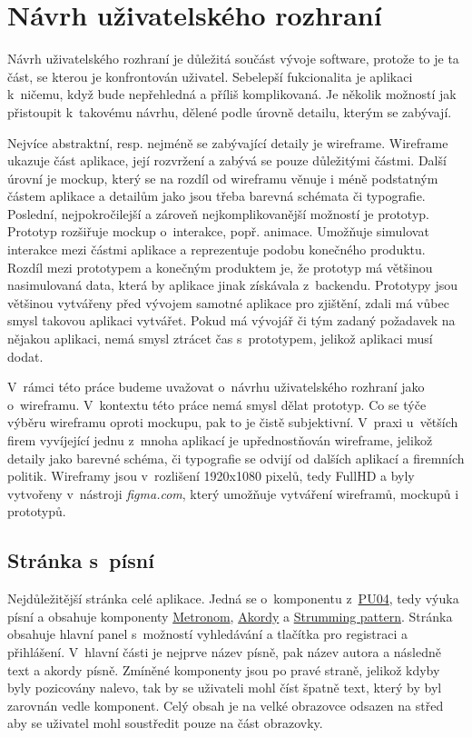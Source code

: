 \section{Návrh uživatelského rozhraní}
\label{sc:wireframes}
Návrh uživatelského rozhraní je důležitá součást vývoje software, protože to je ta část, se kterou je konfrontován uživatel. Sebelepší fukcionalita je aplikaci k~ničemu, když bude nepřehledná a příliš komplikovaná. Je několik možností jak přistoupit k~takovému návrhu, dělené podle úrovně detailu, kterým se zabývají.

Nejvíce abstraktní, resp. nejméně se zabývající detaily je wireframe. Wireframe ukazuje část aplikace, její rozvržení a zabývá se pouze důležitými částmi. Další úrovní je mockup, který se na rozdíl od wireframu věnuje i méně podstatným částem aplikace a detailům jako jsou třeba barevná schémata či typografie. Poslední, nejpokročilejší a zároveň nejkomplikovanější možností je prototyp. Prototyp rozšiřuje mockup o~interakce, popř. animace. Umožňuje simulovat interakce mezi částmi aplikace a reprezentuje podobu konečného produktu. Rozdíl mezi prototypem a konečným produktem je, že prototyp má většinou nasimulovaná data, která by aplikace jinak získávala z~backendu. Prototypy jsou většinou vytvářeny před vývojem samotné aplikace pro zjištění, zdali má vůbec smysl takovou aplikaci vytvářet. Pokud má vývojář či tým zadaný požadavek na nějakou aplikaci, nemá smysl ztrácet čas s~prototypem, jelikož aplikaci musí dodat.

V~rámci této práce budeme uvažovat o~návrhu uživatelského rozhraní jako o~wireframu. V~kontextu této práce nemá smysl dělat prototyp. Co se týče výběru wireframu oproti mockupu, pak to je čistě subjektivní. V~praxi u~větších firem vyvíjející jednu z~mnoha aplikací je upřednostňován wireframe, jelikož detaily jako barevné schéma, či typografie se odvijí od dalších aplikací a firemních politik. Wireframy jsou v~rozlišení 1920x1080 pixelů, tedy FullHD a byly vytvořeny v~nástroji \emph{figma.com}, který umožňuje vytváření wireframů, mockupů i prototypů.

\subsection{Stránka s~písní}
\label{ss:wireframe_song}
Nejdůležitější stránka celé aplikace. Jedná se o~komponentu z~\hyperref[uc04]{PU04}, tedy výuka písní a obsahuje komponenty \hyperref[uc1]{Metronom}, \hyperref[uc2]{Akordy} a \hyperref[uc3]{Strumming pattern}. Stránka obsahuje hlavní panel s~možností vyhledávání a tlačítka pro registraci a přihlášení. V~hlavní části je nejprve název písně, pak název autora a následně text a akordy písně. Zmíněné komponenty jsou po pravé straně, jelikož kdyby byly pozicovány nalevo, tak by se uživateli mohl číst špatně text, který by byl zarovnán vedle komponent. Celý obsah je na velké obrazovce odsazen na střed aby se uživatel mohl soustředit pouze na část obrazovky.

